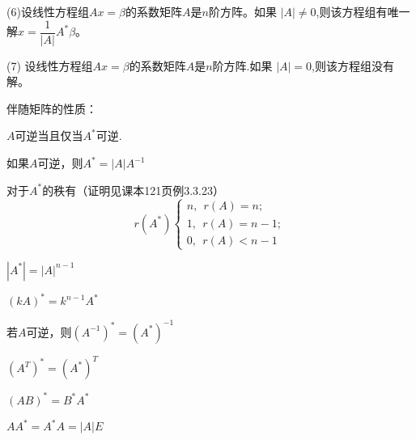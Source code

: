 \documentclass[a4paper]{report}
\begin{document}
(6)设线性方程组$Ax= \beta$的系数矩阵$A$是$n$阶方阵。如果
$|A|\neq 0$,则该方程组有唯一解$x=\dfrac{1}{|A|}A^*\beta$。

(7) 设线性方程组$Ax= \beta$的系数矩阵$A$是$n$阶方阵.如果
$|A|=0$,则该方程组没有解。

\begin{tips}
伴随矩阵的性质：

\begin{asparaenum}[(1)]
\item $A$可逆当且仅当$A^*$可逆.
\item 如果$A$可逆，则$A^*=|A|A^{-1}$
\item 对于$A^*$的秩有（证明见课本121页例3.3.23）
\begin{equation*}
r(A^*)
  \begin{cases}
    n,~~r(A)=n;\\
    1,~~r(A)=n-1;\\
    0,~~r(A)<n-1
  \end{cases}
\end{equation*}
\item $|A^*|=|A|^{n-1}$
\item $(kA)^*=k^{n-1}A^*$
\item 若$A$可逆，则$(A^{-1})^*=(A^*)^{-1}$
\item $(A^T)^*=(A^*)^T$
\item $(AB)^*=B^*A^*$
\item $AA^*=A^*A=|A|E$
\end{asparaenum}
\hphantom{.}
\end{tips}
\end{document}
